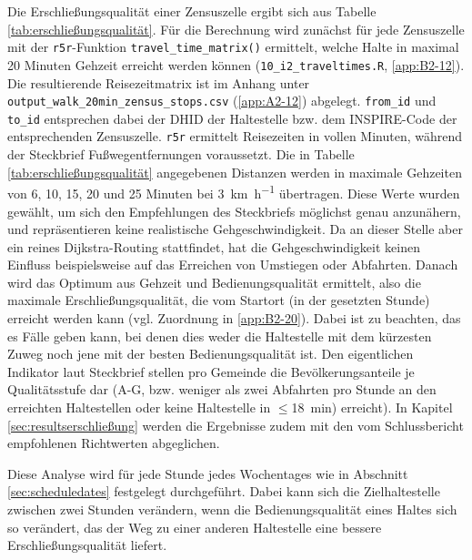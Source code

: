 \documentclass[11pt,pdftex,a4paper]{scrartcl}
\begin{document}
	Die Erschließungsqualität einer Zensuszelle ergibt sich aus Tabelle \ref{tab:erschließungsqualität}. Für die Berechnung wird zunächst für jede Zensuszelle mit der \texttt{r5r}-Funktion \texttt{travel\_time\_matrix()} ermittelt, welche Halte in maximal 20 Minuten Gehzeit erreicht werden können (\texttt{10\_i2\_traveltimes.R}, \ref{app:B2-12}). Die resultierende Reisezeitmatrix ist im Anhang unter \texttt{output\_walk\_20min\_zensus\_stops.csv} (\ref{app:A2-12}) abgelegt. \texttt{from\_id} und \texttt{to\_id} entsprechen dabei der DHID der Haltestelle bzw. dem INSPIRE-Code der entsprechenden Zensuszelle. \texttt{r5r} ermittelt Reisezeiten in vollen Minuten, während der Steckbrief Fußwegentfernungen voraussetzt. Die in Tabelle \ref{tab:erschließungsqualität} angegebenen Distanzen werden in maximale Gehzeiten von 6, 10, 15, 20 und 25 Minuten bei \SI{3}{\kilo\meter\per\hour} übertragen. Diese Werte wurden gewählt, um sich den Empfehlungen des Steckbriefs möglichst genau anzunähern, und repräsentieren keine realistische Gehgeschwindigkeit. Da an dieser Stelle aber ein reines Dijkstra-Routing stattfindet, hat die Gehgeschwindigkeit keinen Einfluss beispielsweise auf das Erreichen von Umstiegen oder Abfahrten. Danach wird das Optimum aus Gehzeit und Bedienungsqualität ermittelt, also die maximale Erschließungsqualität, die vom Startort (in der gesetzten Stunde) erreicht werden kann (vgl. Zuordnung in \ref{app:B2-20}). Dabei ist zu beachten, das es Fälle geben kann, bei denen dies weder die Haltestelle mit dem kürzesten Zuweg noch jene mit der besten Bedienungsqualität ist. Den eigentlichen Indikator laut Steckbrief stellen pro Gemeinde die Bevölkerungsanteile je Qualitätsstufe dar (A-G, bzw. weniger als zwei Abfahrten pro Stunde an den erreichten Haltestellen oder keine Haltestelle in $\leq$\SI{18}{\minute}) erreicht)\parencite[26]{bmdvIndikatorenLeichtGemacht2025}. In Kapitel \ref{sec:resultserschließung} werden die Ergebnisse zudem mit den vom Schlussbericht empfohlenen Richtwerten \parencite[124, Tabelle 5-3]{bmdvForschungsprojektIndikatorenNachhaltiger2023} abgeglichen.
	
	Diese Analyse wird für jede Stunde jedes Wochentages wie in Abschnitt \ref{sec:scheduledates} festgelegt durchgeführt. Dabei kann sich die Zielhaltestelle zwischen zwei Stunden verändern, wenn die Bedienungsqualität eines Haltes sich so verändert, das der Weg zu einer anderen Haltestelle eine bessere Erschließungsqualität liefert.
\end{document}
